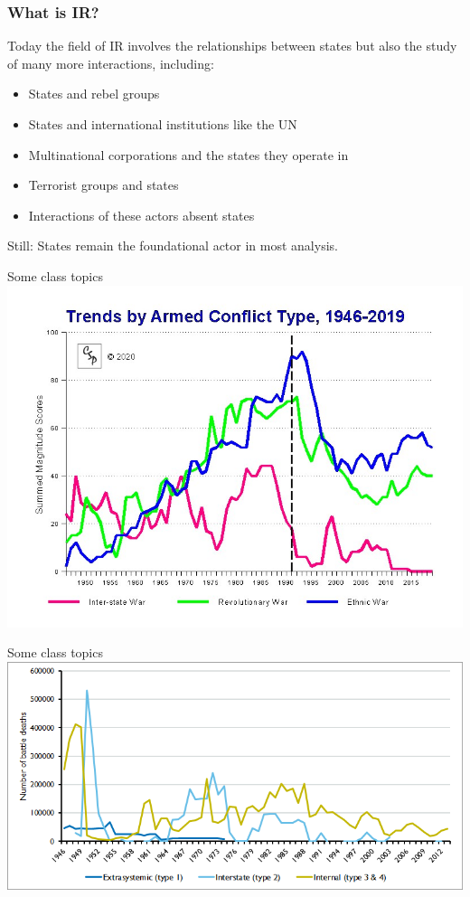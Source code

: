 \documentclass[handout]{beamer}
\begin{document}
\begin{frame}
\frametitle{\LARGE{What is IR?}}

Today the field of IR involves the relationships between states but also the study of many more interactions, including:
\begin{itemize}
	\item States and rebel groups \pause
	\item States and international institutions like the UN \pause
	\item Multinational corporations and the states they operate in \pause
	\item Terrorist groups and states \pause
	\item Interactions of these actors absent states \pause
\end{itemize}
Still: States remain the foundational actor in most analysis.
\end{frame}

\begin{frame}{\LARGE Some class topics} %
\centering
\includegraphics[width=\textwidth,height=0.9\textheight,keepaspectratio]{wartyp19.jpg}
\end{frame}

\begin{frame}{\LARGE Some class topics} %
	\centering
	\includegraphics[width=\textwidth]{battledeathnumbers.png}
\end{frame}
\end{document}
